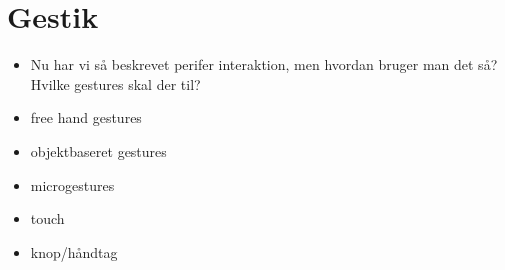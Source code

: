 \section{Gestik}
\label{Gestik}

\begin{itemize}
	\item Nu har vi så beskrevet perifer interaktion, men hvordan bruger man det så? Hvilke gestures skal der til?
	\item free hand gestures
	\item objektbaseret gestures
	\item microgestures
	\item touch
	\item knop/håndtag 
\end{itemize}
